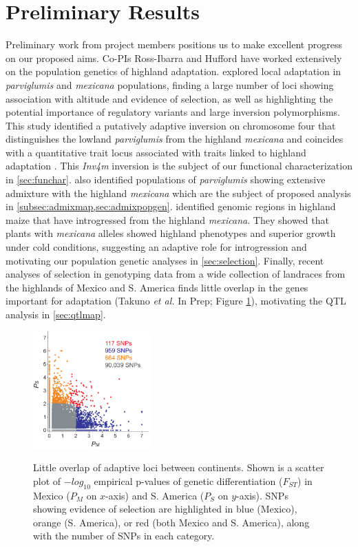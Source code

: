 \section*{Preliminary Results}
Preliminary work from project members positions us to make excellent progress on our proposed aims. Co-PIs Ross-Ibarra and Hufford have worked extensively on the population genetics of highland adaptation.    \citet{Pyhajarvi2013} explored local adaptation in \emph{parviglumis} and \emph{mexicana} populations, finding a large number of loci showing association with altitude and evidence of selection, as well as highlighting the potential importance of regulatory variants and large inversion polymorphisms. This study identified a putatively adaptive inversion on chromosome four that distinguishes the lowland \emph{parviglumis} from the highland \emph{mexicana} and coincides with a quantitative trait locus associated with  traits  linked to highland adaptation \citep{Lauter2004a}. This \emph{Inv4m} inversion is the subject of our functional characterization in \ref{sec:funchar}.  \citet{Pyhajarvi2013} also identified populations of \emph{parviglumis} showing extensive admixture with the highland \emph{mexicana} which are the subject of proposed analysis in \ref{subsec:admixmap,sec:admixpopgen}. \citet{Hufford2013} identified genomic regions in highland maize that have introgressed from the highland  \emph{mexicana}.  They showed that  plants with \emph{mexicana} alleles showed highland phenotypes and superior growth under cold conditions, suggesting an adaptive role for introgression and motivating our population genetic analyses in \ref{sec:selection}.  Finally, recent analyses of selection in genotyping data from a wide collection of landraces from the highlands of Mexico and S. America finds little overlap in the genes important for adaptation (Takuno \emph{et al.} In Prep; Figure \ref{fig:fst}), motivating the QTL analysis in \ref{sec:qtlmap}.

\begin{figure}
  \centering \label{fig:fst}
   \includegraphics[width=0.4\textwidth]{fst.pdf}
  \caption{Little overlap of adaptive loci between continents. Shown is a scatter plot of $-log_{10}$ empirical p-values of genetic differentiation ($F_{ST}$) in Mexico ($P_M$ on $x$-axis) and S. America ($P_S$ on $y$-axis).  SNPs showing evidence of selection are highlighted in blue (Mexico), orange (S. America), or red (both Mexico and S. America), along with the number of SNPs in each category.} 
\end{figure}

